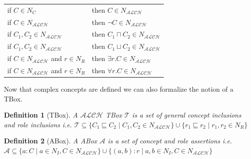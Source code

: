 \documentclass[titlepage]{article}
\newtheorem{definition}{Definition}
\begin{document}
    \begin{tabular}{l l}
      if $C \in N_C$ & then $C \in N_{\mathcal{ALCH}}$ \\
      if $C \in N_{\mathcal{ALCH}}$ & then $\neg C \in N_{\mathcal{ALCH}}$ \\
      if $C_1,C_2 \in N_{\mathcal{ALCH}}$ & then $C_1 \sqcap C_2 \in N_{\mathcal{ALCH}}$ \\
      if $C_1,C_2 \in N_{\mathcal{ALCH}}$ & then $C_1 \sqcup C_2 \in N_{\mathcal{ALCH}}$ \\
      if $C \in N_{\mathcal{ALCH}}$ and $r \in N_R$ & then $\exists r.C \in N_{\mathcal{ALCH}}$ \\
      if $C \in N_{\mathcal{ALCH}}$ and $r \in N_R$ & then $\forall r.C \in N_{\mathcal{ALCH}}$ \\
    \end{tabular} 

Now that complex concepts are defined we can also formalize the notion of a TBox.

\begin{definition}[TBox]
  A $\mathcal{ALCH}$ TBox $\mathcal{T}$ is a set of general concept inclusions and role inclusions i.e.
  $\mathcal{T} \subseteq \{C_1 \sqsubseteq C_2 \mid C_1, C_2 \in N_{\mathcal{ALCH}} \} \cup 
  \{r_1 \sqsubseteq r_2 \mid r_1, r_2 \in N_R\}$
\end{definition}

\begin{definition}[ABox]
  A ABox $\mathcal{A}$ is a set of concept and role assertions i.e.
  $\mathcal{A} \subseteq \{a:C \mid a \in N_I, C \in N_{\mathcal{ALCH}}\}
  \cup \{(a,b):r \mid a,b \in N_I, C \in N_{\mathcal{ALCH}}\}$
\end{definition}
\end{document}
